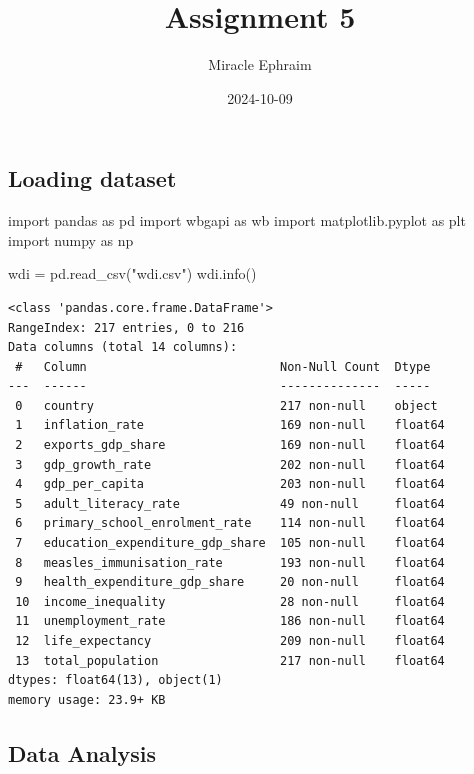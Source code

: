 \documentclass[
  letterpaper,
  DIV=11,
  numbers=noendperiod]{scrartcl}
\title{Assignment 5}
\author{Miracle Ephraim}
\date{2024-10-09}
\newenvironment{Shaded}{\begin{snugshade}}{\end{snugshade}}
\newcommand{\ImportTok}[1]{\textcolor[rgb]{0.00,0.46,0.62}{#1}}
\newcommand{\NormalTok}[1]{\textcolor[rgb]{0.00,0.23,0.31}{#1}}
\newcommand{\OperatorTok}[1]{\textcolor[rgb]{0.37,0.37,0.37}{#1}}
\newcommand{\StringTok}[1]{\textcolor[rgb]{0.13,0.47,0.30}{#1}}
\begin{document}
\maketitle


\subsection{Loading dataset}\label{loading-dataset}

\begin{Shaded}
\begin{Highlighting}[]
\ImportTok{import}\NormalTok{ pandas }\ImportTok{as}\NormalTok{ pd}
\ImportTok{import}\NormalTok{ wbgapi }\ImportTok{as}\NormalTok{ wb}
\ImportTok{import}\NormalTok{ matplotlib.pyplot }\ImportTok{as}\NormalTok{ plt}
\ImportTok{import}\NormalTok{ numpy }\ImportTok{as}\NormalTok{ np}

\NormalTok{wdi }\OperatorTok{=}\NormalTok{ pd.read\_csv(}\StringTok{"wdi.csv"}\NormalTok{)}
\NormalTok{wdi.info()}
\end{Highlighting}
\end{Shaded}

\begin{verbatim}
<class 'pandas.core.frame.DataFrame'>
RangeIndex: 217 entries, 0 to 216
Data columns (total 14 columns):
 #   Column                           Non-Null Count  Dtype  
---  ------                           --------------  -----  
 0   country                          217 non-null    object 
 1   inflation_rate                   169 non-null    float64
 2   exports_gdp_share                169 non-null    float64
 3   gdp_growth_rate                  202 non-null    float64
 4   gdp_per_capita                   203 non-null    float64
 5   adult_literacy_rate              49 non-null     float64
 6   primary_school_enrolment_rate    114 non-null    float64
 7   education_expenditure_gdp_share  105 non-null    float64
 8   measles_immunisation_rate        193 non-null    float64
 9   health_expenditure_gdp_share     20 non-null     float64
 10  income_inequality                28 non-null     float64
 11  unemployment_rate                186 non-null    float64
 12  life_expectancy                  209 non-null    float64
 13  total_population                 217 non-null    float64
dtypes: float64(13), object(1)
memory usage: 23.9+ KB
\end{verbatim}

\subsection{Data Analysis}\label{data-analysis}
\end{document}
